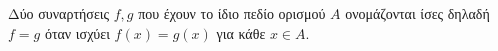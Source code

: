 Δύο συναρτήσεις $ f,g $ που έχουν το ίδιο πεδίο ορισμού $ A $ ονομάζονται ίσες δηλαδή $ f=g $ όταν ισχύει $ f(x)=g(x) $ για κάθε $ x\in A $.
